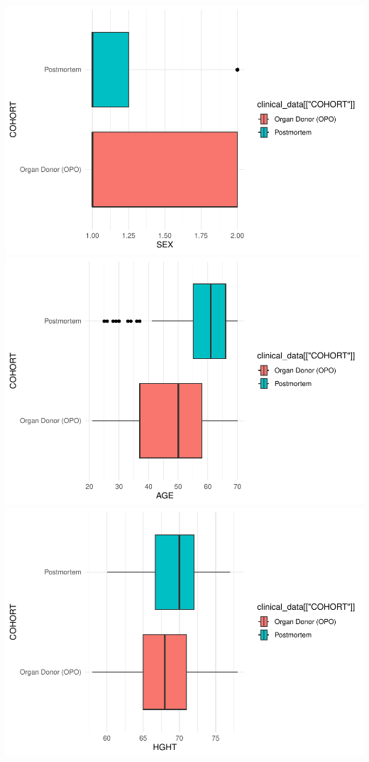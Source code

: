 \documentclass[
]{article}
\begin{document}
\includegraphics{Q1_markdown_files/figure-latex/unnamed-chunk-8-1.pdf}
\includegraphics{Q1_markdown_files/figure-latex/unnamed-chunk-8-2.pdf}
\includegraphics{Q1_markdown_files/figure-latex/unnamed-chunk-8-3.pdf}
\end{document}
